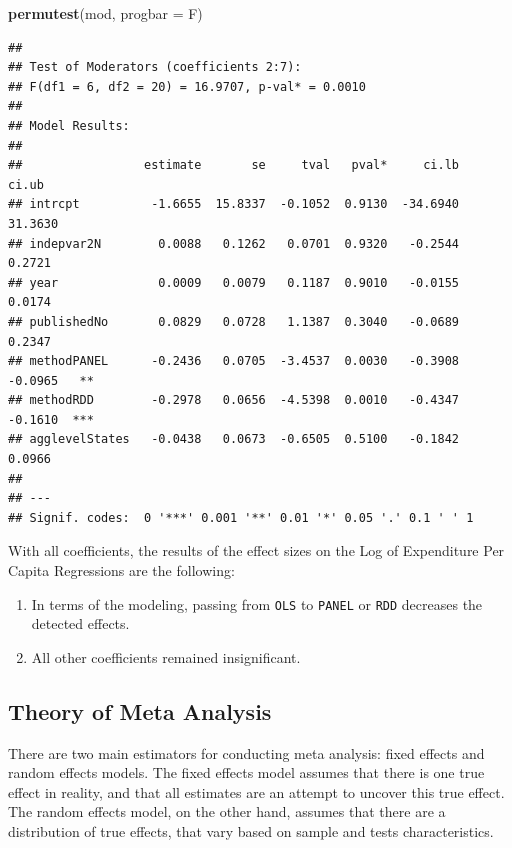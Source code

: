 \documentclass[
]{article}
\newenvironment{Shaded}{\begin{snugshade}}{\end{snugshade}}
\newcommand{\DataTypeTok}[1]{\textcolor[rgb]{0.13,0.29,0.53}{#1}}
\newcommand{\KeywordTok}[1]{\textcolor[rgb]{0.13,0.29,0.53}{\textbf{#1}}}
\newcommand{\NormalTok}[1]{#1}
\providecommand{\tightlist}{%
  \setlength{\itemsep}{0pt}\setlength{\parskip}{0pt}}
\begin{document}
\begin{Shaded}
\begin{Highlighting}[]
\KeywordTok{permutest}\NormalTok{(mod, }\DataTypeTok{progbar =}\NormalTok{ F)}
\end{Highlighting}
\end{Shaded}

\begin{verbatim}
## 
## Test of Moderators (coefficients 2:7):
## F(df1 = 6, df2 = 20) = 16.9707, p-val* = 0.0010
## 
## Model Results:
## 
##                 estimate       se     tval   pval*     ci.lb    ci.ub 
## intrcpt          -1.6655  15.8337  -0.1052  0.9130  -34.6940  31.3630      
## indepvar2N        0.0088   0.1262   0.0701  0.9320   -0.2544   0.2721      
## year              0.0009   0.0079   0.1187  0.9010   -0.0155   0.0174      
## publishedNo       0.0829   0.0728   1.1387  0.3040   -0.0689   0.2347      
## methodPANEL      -0.2436   0.0705  -3.4537  0.0030   -0.3908  -0.0965   ** 
## methodRDD        -0.2978   0.0656  -4.5398  0.0010   -0.4347  -0.1610  *** 
## agglevelStates   -0.0438   0.0673  -0.6505  0.5100   -0.1842   0.0966      
## 
## ---
## Signif. codes:  0 '***' 0.001 '**' 0.01 '*' 0.05 '.' 0.1 ' ' 1
\end{verbatim}

With all coefficients, the results of the effect sizes on the Log of
Expenditure Per Capita Regressions are the following:

\begin{enumerate}
\def\labelenumi{\arabic{enumi}.}
\tightlist
\item
  In terms of the modeling, passing from \texttt{OLS} to \texttt{PANEL}
  or \texttt{RDD} decreases the detected effects.
\item
  All other coefficients remained insignificant.
\end{enumerate}

\hypertarget{theory-of-meta-analysis}{%
\subsection{Theory of Meta Analysis}\label{theory-of-meta-analysis}}

There are two main estimators for conducting meta analysis: fixed
effects and random effects models. The fixed effects model assumes that
there is one true effect in reality, and that all estimates are an
attempt to uncover this true effect. The random effects model, on the
other hand, assumes that there are a distribution of true effects, that
vary based on sample and tests characteristics.
\end{document}
